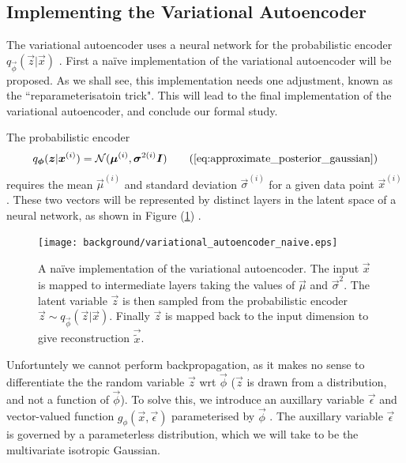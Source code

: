 \subsection{Implementing the Variational Autoencoder}

The variational autoencoder uses a neural network for the probabilistic encoder $q_{\vec{\phi}}(\vec{z}|\vec{x})$ \cite{Kingma2014}. First a na\"{i}ve implementation of the variational autoencoder will be proposed. As we shall see, this implementation needs one adjustment, known as the ``reparameterisatoin trick". This will lead to the final implementation of the variational autoencoder, and conclude our formal study.

The probabilistic encoder
\begin{align}
q_{\vec{\phi}}(\vec{z} | \vec{x}^{(i)}) = \mathcal{N}(\vec{\mu}^{(i)}, \vec{\sigma}^{2(i)}\vec{I})
\tag{\ref{eq:approximate_posterior_gaussian}}
\end{align}
requires the mean $\vec{\mu}^{(i)}$ and standard deviation $\vec{\sigma}^{(i)}$ for a given data point $\vec{x}^{(i)}$. These two vectors will be represented by distinct layers in the latent space of a neural network, as shown in Figure (\ref{fig:variational_autoencoder_naive}) \cite{Li2016}.\\

\begin{figure}[h!]
\centering
\captionsetup{justification=centering}
\texttt{[image: background/variational\_autoencoder\_naive.eps]}
\caption{A na\"{i}ve implementation of the variational autoencoder. The input $\vec{x}$ is mapped to intermediate layers taking the values of $\vec{\mu}$ and $\vec{\sigma}^2$. The latent variable $\vec{z}$ is then sampled from the probabilistic encoder $\vec{z} \sim q_{\vec{\phi}}(\vec{z} | \vec{x})$. Finally $\vec{z}$ is mapped back to the input dimension to give reconstruction $\vec{\tilde{x}}$.}
\label{fig:variational_autoencoder_naive}
\end{figure}

Unfortuntely we cannot perform backpropagation, as it makes no sense to differentiate the the random variable $\vec{z}$ wrt $\vec{\phi}$ ($\vec{z}$ is drawn from a distribution, and not a function of $\vec{\phi}$). To solve this, we introduce an auxillary variable $\vec{\epsilon}$ and vector-valued function $g_{\phi}(\vec{x}, \vec{\epsilon})$ parameterised by $\vec{\phi}$ \cite{Kingma2014}. The auxillary variable $\vec{\epsilon}$ is governed by a parameterless distribution, which we will take to be the multivariate isotropic Gaussian.


